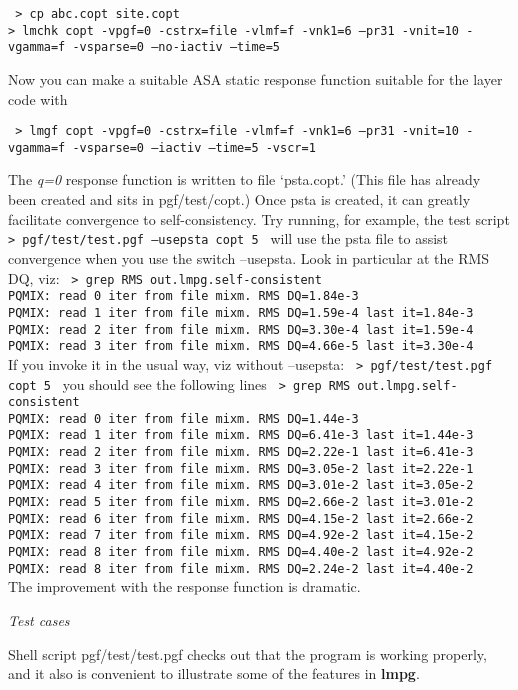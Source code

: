 \documentclass{article}
\begin{document}
{\tt
\vskip 6pt
\noindent
> cp abc.copt site.copt \\
> lmchk copt -vpgf=0 -cstrx=file -vlmf=f -vnk1=6 --pr31 -vnit=10 -vgamma=f -vsparse=0 --no-iactiv --time=5
\vskip 6pt
}

Now you can make a suitable ASA static response function suitable for the
layer code with

{\tt
\vskip 6pt
> lmgf copt -vpgf=0 -cstrx=file -vlmf=f -vnk1=6 --pr31 -vnit=10 -vgamma=f -vsparse=0 --iactiv --time=5 -vscr=1
\vskip 6pt
}

\noindent
The {\em q=0} response function is written to file `psta.copt.'
(This file has already been created and sits in pgf/test/copt.)  Once psta is
created, it can greatly facilitate convergence to
self-consistency.  Try running, for example, the test script
{\tt
\vskip 6pt
\noindent
>  pgf/test/test.pgf --usepsta copt 5
\vskip 6pt
}
\noindent
will use the psta file to assist convergence when you use the switch
--usepsta.  Look in particular at the RMS DQ, viz:
{\tt
\vskip 6pt
\noindent
> grep RMS out.lmpg.self-consistent \\
 PQMIX:  read 0 iter from file mixm.  RMS DQ=1.84e-3 \\
 PQMIX:  read 1 iter from file mixm.  RMS DQ=1.59e-4  last it=1.84e-3 \\
 PQMIX:  read 2 iter from file mixm.  RMS DQ=3.30e-4  last it=1.59e-4 \\
 PQMIX:  read 3 iter from file mixm.  RMS DQ=4.66e-5  last it=3.30e-4 \\
\vskip 6pt
}
\noindent
If you invoke it in the usual way, viz without --usepsta:
{\tt
\vskip 6pt
\noindent
>  pgf/test/test.pgf copt 5
\vskip 6pt
}
\noindent you should see the following lines
{\tt
\vskip 6pt
\noindent
> grep RMS out.lmpg.self-consistent \\
 PQMIX:  read 0 iter from file mixm.  RMS DQ=1.44e-3 \\
 PQMIX:  read 1 iter from file mixm.  RMS DQ=6.41e-3  last it=1.44e-3 \\
 PQMIX:  read 2 iter from file mixm.  RMS DQ=2.22e-1  last it=6.41e-3 \\
 PQMIX:  read 3 iter from file mixm.  RMS DQ=3.05e-2  last it=2.22e-1 \\
 PQMIX:  read 4 iter from file mixm.  RMS DQ=3.01e-2  last it=3.05e-2 \\
 PQMIX:  read 5 iter from file mixm.  RMS DQ=2.66e-2  last it=3.01e-2 \\
 PQMIX:  read 6 iter from file mixm.  RMS DQ=4.15e-2  last it=2.66e-2 \\
 PQMIX:  read 7 iter from file mixm.  RMS DQ=4.92e-2  last it=4.15e-2 \\
 PQMIX:  read 8 iter from file mixm.  RMS DQ=4.40e-2  last it=4.92e-2 \\
 PQMIX:  read 8 iter from file mixm.  RMS DQ=2.24e-2  last it=4.40e-2 \\
\vskip 6pt
}
\noindent
The improvement with the response function is dramatic.

\vskip 12pt
\noindent
{\sl Test cases}

Shell script pgf/test/test.pgf checks out that the program is working
properly, and it also is convenient to illustrate some of the features
in {\bf lmpg}.
\end{document}
